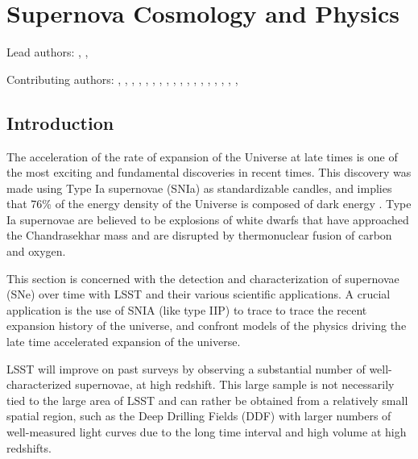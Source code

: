 %
%
%
\clearpage
\section{Supernova Cosmology and Physics}
\def\secname{supernovae}\label{sec:\secname}

\newcommand{\ml}[1]{\textcolor{red}{[{\bf ML}: #1]}}

Lead authors:
,
,

Contributing authors:
,
,
,
,
,
,
,
,
,
,
,
,
,
,
,
,
,
,

\subsection{Introduction}
The acceleration of the rate of expansion of the Universe at late times is one of the
most exciting and fundamental discoveries\citep{Riess1998,Perlmutter1999} in recent times.
This discovery was made using Type Ia supernovae (SNIa) as standardizable candles, and
implies that 76\% of the energy density of the Universe is composed of dark energy
\citep{Frieman2008}. Type Ia supernovae are believed to be explosions of white
dwarfs that have approached the Chandrasekhar mass and are disrupted by
thermonuclear fusion of carbon and oxygen.


This section is concerned with the detection and characterization of
supernovae (SNe) over time with LSST and their various scientific
applications. A crucial application is the use of SNIA %
(like type IIP) to trace
to trace the recent expansion history of the universe, and confront models of the
physics driving the late time accelerated expansion of the universe.

LSST will improve on past surveys by observing a substantial number of well-characterized
supernovae, at high redshift. This large sample is not necessarily tied to the large area of LSST
and can rather be obtained from a relatively small spatial region, such as the Deep Drilling Fields
(DDF) with larger numbers of well-measured light curves due to the long time interval and high volume
at high redshifts.


